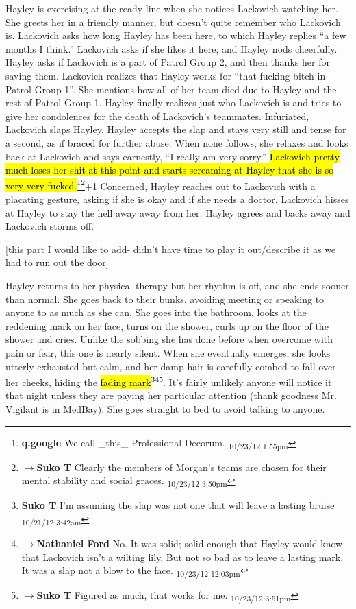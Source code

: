 Hayley is exercising at the ready line when she notices Lackovich watching her.  She greets her in a friendly manner, but doesn't quite remember who Lackovich is.  Lackovich asks how long Hayley has been here, to which Hayley replies ``a few months I think.''  Lackovich asks if she likes it here, and Hayley nods cheerfully.  Hayley asks if Lackovich is a part of Patrol Group 2, and then thanks her for saving them.  Lackovich realizes that Hayley works for ``that fucking bitch in Patrol Group 1''.  She mentions how all of her team died due to Hayley and the rest of Patrol Group 1.  Hayley finally realizes just who Lackovich is and tries to give her condolences for the death of Lackovich's teammates.  Infuriated, Lackovich slaps Hayley.  Hayley accepts the slap and stays very still and tense for a second, as if braced for further abuse.  When none follows, she relaxes and looks back at Lackovich and says earnestly, ``I really am very sorry.''  \hl{Lackovich pretty much loses her shit at this point and starts screaming at Hayley that she is so very very fucked.}\footnote{\textbf{q.google }We call \_this\_ Professional Decorum. \textsubscript{10/23/12 1:55pm}}\footnote{$\rightarrow$\textbf{Suko T }Clearly the members of Morgan's teams are chosen for their mental stability and social graces. \textsubscript{10/23/12 3:50pm}}+1  Concerned, Hayley reaches out to Lackovich with a placating gesture, asking if she is okay and if she needs a doctor.  Lackovich hisses at Hayley to stay the hell away away from her.   Hayley agrees and backs away and Lackovich storms off.



{[}this part I would like to add- didn't have time to play it out/describe it as we had to run out the door{]}

Hayley returns to her physical therapy but her rhythm is off, and she ends sooner than normal.  She goes back to their bunks, avoiding meeting or speaking to anyone to as much as she can.  She goes into the bathroom, looks at the reddening mark on her face, turns on the shower, curls up on the floor of the shower and cries.  Unlike the sobbing she has done before when overcome with pain or fear, this one is nearly silent.  When she eventually emerges, she looks utterly exhausted but calm, and her damp hair is carefully combed to fall over her cheeks, hiding the \hl{fading mark}\footnote{\textbf{Suko T }I'm assuming the slap was not one that will leave a lasting bruise \textsubscript{10/21/12 3:42am}}\footnote{$\rightarrow$\textbf{Nathaniel Ford }No. It was solid; solid enough that Hayley would know that Lackovich isn't a wilting lily. But not so bad as to leave a lasting mark. It was a slap not a blow to the face. \textsubscript{10/23/12 12:03pm}}\footnote{$\rightarrow$\textbf{Suko T }Figured as much, that works for me. \textsubscript{10/23/12 3:51pm}}.  It's fairly unlikely anyone will notice it that night unless they are paying her particular attention (thank goodness Mr. Vigilant is in MedBay).  She goes straight to bed to avoid talking to anyone.



